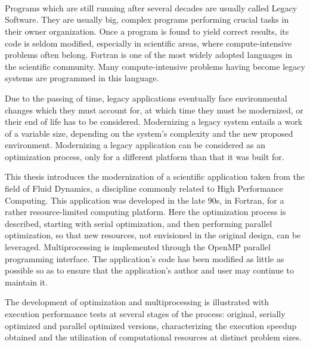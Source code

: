 \ \\
\ \\
\label{pagsumm}
\\
\ \\
\ \\

\ \\

\ \\
\ \\


Programs which are still running after several decades are usually called Legacy Software. They are usually big, complex programs performing crucial tasks in their owner organization. Once a program is found to yield correct results, its code is seldom modified, especially in scientific areas, where compute-intensive problems often belong. Fortran is one of the most widely adopted languages in the scientific community. Many compute-intensive problems having become legacy systems are programmed in this language.

Due to the passing of time, legacy applications eventually face environmental changes which they must account for, at which time they must be modernized, or their end of life has to be considered. Modernizing a legacy system entails a work of a variable size, depending on the system's complexity and the new proposed environment. Modernizing a legacy application can be considered as an optimization process, only for a different platform than that it was built for.

This thesis introduces the modernization of a scientific application taken from the field of Fluid Dynamics, a discipline commonly related to High Performance Computing. This application was developed in the late 90s, in Fortran, for a rather resource-limited computing platform. Here the optimization process is described, starting with serial optimization, and then performing parallel optimization, so that new resources, not envisioned in the original design, can be leveraged. Multiprocessing is implemented through the OpenMP parallel programming interface. The application's code has been modified as little as possible so as to ensure that the application's author and user may continue to maintain it.

The development of optimization and multiprocessing is illustrated with execution performance tests at several stages of the process: original, serially optimized and parallel optimized versions, characterizing the execution speedup obtained and the utilization of computational resources at distinct problem sizes.

\vfill
\pagebreak
